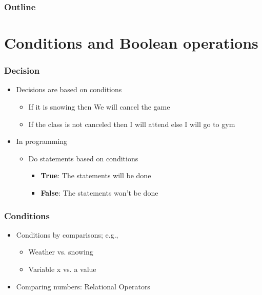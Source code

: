 \documentclass{../c-lecture}
\subtitle{Making Decisions}
\begin{document}
\begin{frame}
  \titlepage{}
\end{frame}
\begin{frame}
  \frametitle{Outline}
  \tableofcontents{}
\end{frame}

\section{Conditions and Boolean operations}

\begin{frame}
  \frametitle{Decision}
  \begin{itemize}
    \item Decisions are based on conditions
    \begin{itemize}
      \item If it is snowing
        then We will cancel the game
      \item If the class is not canceled
        then I will attend
        else I will go to gym
    \end{itemize}
    \item In programming
    \begin{itemize}
      \item Do statements based on conditions
      \begin{itemize}
        \item \textbf{\color{LimeGreen} True}: The statements will be done
        \item \textbf{\color{RubineRed} False}: The statements won't be done
      \end{itemize}
    \end{itemize}
  \end{itemize}
\end{frame}

\begin{frame}
  \frametitle{Conditions}
  \begin{itemize}
    \item Conditions by comparisons; e.g.,
    \begin{itemize}
      \item Weather vs. snowing
      \item Variable x vs. a value
    \end{itemize}
    \item Comparing numbers: Relational Operators
  \end{itemize}
\end{frame}
\end{document}
